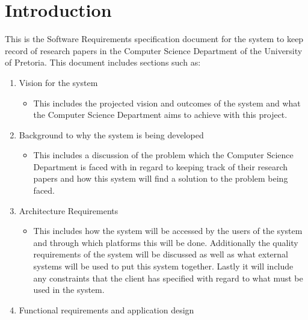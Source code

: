 \documentclass[a4paper,12pt]{article}
\begin{document}
\tableofcontents

\newpage

\section{Introduction}

This is the Software Requirements specification document for the system to keep record of research papers in the Computer Science Department of the University of Pretoria.
This document includes sections such as:
\begin{enumerate}
    \item Vision for the system
\begin{itemize}
    \item This includes the projected vision and outcomes of the system and what the Computer Science Department aims to achieve with this project. 
\end{itemize}

    \item Background to why the system is being developed

\begin{itemize}
    \item This includes a discussion of the problem which the Computer Science Department is faced with in regard to keeping track of their research papers and how this system will find a solution to the problem being faced. 
\end{itemize}

    \item Architecture Requirements
\setlength{\parindent}{2.5em}

\begin{itemize}
    \item This includes how the system will be accessed by the users of the system and through which platforms this will be done. Additionally the quality requirements of the system will be discussed as well as what external systems will be used to put this system together. Lastly it will include any constraints that the client has specified with regard to what must be used in the system. 
\end{itemize}

    \item Functional requirements and application design


\end{enumerate}
\end{document}

